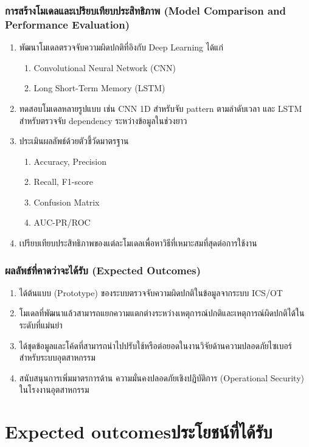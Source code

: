 \subsubsection{การสร้างโมเดลและเปรียบเทียบประสิทธิภาพ (Model Comparison and Performance Evaluation)}
\begin{enumerate}
    \item พัฒนาโมเดลตรวจจับความผิดปกติที่อิงกับ Deep Learning ได้แก่ 
    \begin{enumerate}
        \item Convolutional Neural Network (CNN)
        \item  Long Short-Term Memory (LSTM)
    \end{enumerate}
    \item ทดสอบโมเดลหลายรูปแบบ เช่น CNN 1D สำหรับจับ pattern ตามลำดับเวลา และ LSTM สำหรับตรวจจับ dependency ระหว่างข้อมูลในช่วงยาว
    \item ประเมินผลลัพธ์ด้วยตัวชี้วัดมาตรฐาน
    \begin{enumerate}
        \item Accuracy, Precision
        \item Recall, F1-score
        \item Confusion Matrix 
        \item AUC-PR/ROC
    \end{enumerate}
    \item เปรียบเทียบประสิทธิภาพของแต่ละโมเดลเพื่อหาวิธีที่เหมาะสมที่สุดต่อการใช้งาน
\end{enumerate}

\subsubsection{ผลลัพธ์ที่คาดว่าจะได้รับ (Expected Outcomes)}
\begin{enumerate}
    \item ได้ต้นแบบ (Prototype) ของระบบตรวจจับความผิดปกติในข้อมูลจากระบบ ICS/OT
    \item โมเดลที่พัฒนาแล้วสามารถแยกความแตกต่างระหว่างเหตุการณ์ปกติและเหตุการณ์ผิดปกติได้ในระดับที่แม่นยำ
    \item ได้ชุดข้อมูลและโค้ดที่สามารถนำไปปรับใช้หรือต่อยอดในงานวิจัยด้านความปลอดภัยไซเบอร์สำหรับระบบอุตสาหกรรม
    \item สนับสนุนการเพิ่มมาตรการด้าน ความมั่นคงปลอดภัยเชิงปฏิบัติการ (Operational Security) ในโรงงานอุตสาหกรรม
\end{enumerate}

\section{\ifenglish Expected outcomes\else ประโยชน์ที่ได้รับ\fi}

